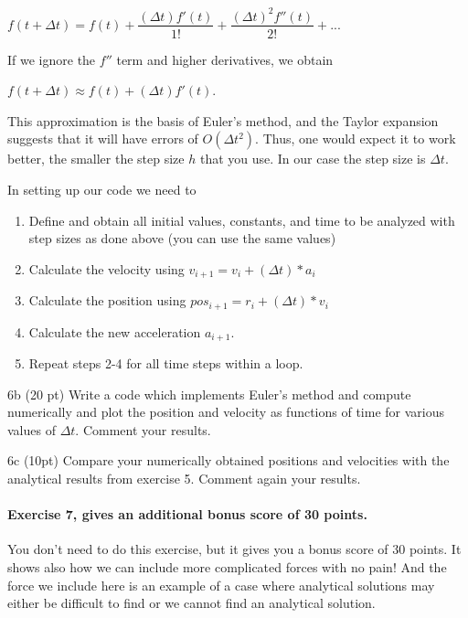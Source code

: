 \documentclass[%
oneside,                 %
final,                   %
10pt]{article}
\begin{document}
$f(t+\Delta t) = f(t) + \dfrac{(\Delta t)f'(t)}{1!} + \dfrac{(\Delta t)^2f''(t)}{2!} + ...$

If we ignore the $f''$ term and higher derivatives, we obtain

$f(t+\Delta t) \approx f(t) + (\Delta t)f'(t)$.

This approximation is the basis of Euler's method, and the Taylor
expansion suggests that it will have errors of $O(\Delta t^2)$.  Thus, one
would expect it to work better, the smaller the step size $h$ that you
use. In our case the step size is $\Delta t$. 

In setting up our code we need to

\begin{enumerate}
\item Define and obtain all initial values, constants, and time to be analyzed with step sizes as done above (you can use the same values)

\item Calculate the velocity using $v_{i+1} = v_{i} + (\Delta t)*a_{i}$

\item Calculate the position using $pos_{i+1} = r_{i} + (\Delta t)*v_{i}$

\item Calculate the new acceleration $a_{i+1}$.

\item Repeat steps 2-4 for all time steps within a loop.

\end{enumerate}

\noindent
\item 6b (20 pt) Write a code which implements Euler's method and compute numerically and plot the position and velocity as functions of time for various values of $\Delta t$. Comment your results.



\item 6c (10pt) Compare your numerically obtained positions and velocities with the analytical results from exercise 5. Comment again your results.


\paragraph{Exercise 7, gives an additional bonus score of 30 points.}
You don't need to do this exercise, but it gives you a bonus score of 30 points. It shows also how we can include more complicated forces with no pain! And the force we include here is an example of a case where analytical solutions may either be difficult to find or we cannot find an analytical solution. 
\end{document}
